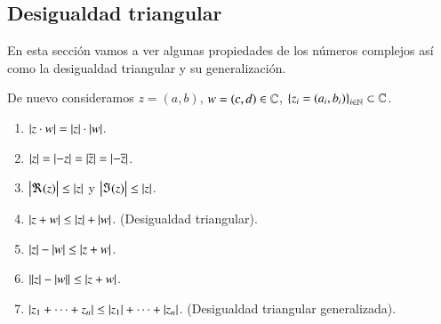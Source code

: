 \subsection{Desigualdad triangular}
    En esta sección vamos a ver algunas propiedades de los números complejos así como la desigualdad triangular y su generalización.
    \begin{pro}
        De nuevo consideramos $z = (a, b)$, $w = (c, d)\in \mathbb{C}$, $\left\{z_i=(a_i, b_i)\right\}_{i\in \mathbb{N}} \subset \mathbb{C}$.
        \begin{enumerate}
            \item $\left|z \cdot w\right| = \left|z\right| \cdot \left|w\right|$.
            \item $\left|z\right| = \left|-z\right| = \left|\overline{z}\right| = \left|-\overline{z}\right|$.
            \item $\left|\Re(z)\right| \leq \left|z\right|$ y $\left|\Im(z)\right| \leq \left|z\right|$.
            \item $\left|z + w\right| \leq \left|z\right| + \left|w\right|$. (Desigualdad triangular).
            \item $\left|z\right| - \left|w\right| \leq \left|z + w\right|$.
            \item $\left| \left|z\right| - \left|w\right| \right| \leq \left|z + w\right|$.
            \item $\left|z_1 + \cdots + z_n\right| \leq \left|z_1\right| + \cdots + \left|z_n\right|$. (Desigualdad triangular generalizada).
        \end{enumerate}
    \end{pro}
